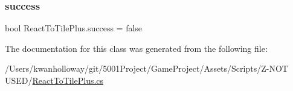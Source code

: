 \subsubsection{\texorpdfstring{success}{success}}
{\footnotesize\ttfamily bool React\+To\+Tile\+Plus.\+success = false}



The documentation for this class was generated from the following file\+:\begin{DoxyCompactItemize}
\item 
/\+Users/kwanholloway/git/5001\+Project/\+Game\+Project/\+Assets/\+Scripts/\+Z-\/\+N\+O\+T U\+S\+E\+D/\hyperlink{_react_to_tile_plus_8cs}{React\+To\+Tile\+Plus.\+cs}\end{DoxyCompactItemize}
